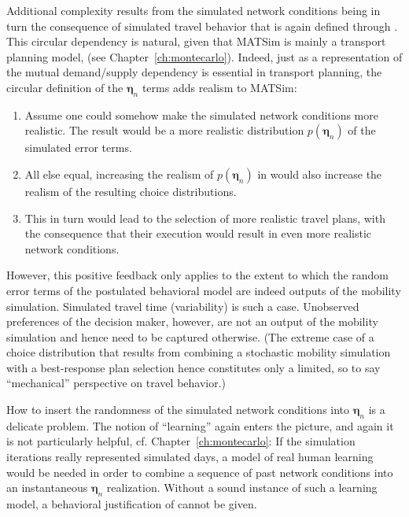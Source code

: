 Additional complexity results from the simulated network conditions
being in turn the consequence of simulated travel behavior that is
again defined through . This circular
dependency is natural, given that MATSim is mainly a transport planning
model, (see Chapter~\ref{ch:montecarlo}). Indeed, just as a representation
of the mutual demand/supply dependency is essential in transport planning,
the circular definition of the $\boldsymbol{\eta}_n$ terms adds realism to MATSim:
\begin{enumerate}
\item Assume one could somehow make the simulated network conditions more
realistic. The result would be a more realistic distribution $p(\boldsymbol{\eta}_n)$
of the simulated error terms.
\item All else equal, increasing the realism of $p(\boldsymbol{\eta}_n)$ in 
would also increase the realism of the resulting choice distributions.
\item This in turn would lead to the selection of more realistic travel
plans, with the consequence that their execution would result in even
more realistic network conditions.
\end{enumerate}
However, this positive feedback only applies to the extent to which
the random error terms of the postulated behavioral model are indeed
outputs of the mobility simulation. Simulated travel time (variability)
is such a case. Unobserved preferences of the decision maker, however,
are not an output of the mobility simulation and hence need to be
captured otherwise. (The extreme case of a choice distribution that
results from combining a stochastic mobility simulation with a best-response
plan selection hence constitutes only a limited, so to say {}``mechanical''
perspective on travel behavior.)

How to insert the randomness of the simulated network conditions into
$\boldsymbol{\eta}_n$ is a delicate problem. The notion of {}``learning'' again
enters the picture, and again it is not particularly helpful, cf.
Chapter~\ref{ch:montecarlo}: If the simulation iterations really represented
simulated days, a model of real human learning would be needed in
order to combine a sequence of past network conditions into an instantaneous
$\boldsymbol{\eta}_n$ realization. Without a sound instance of such a learning model,
a behavioral justification of  cannot
be given.

